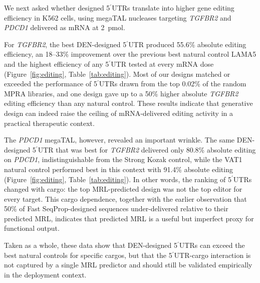 \documentclass[11pt]{article}
\begin{document}
We next asked whether designed 5$^\prime$UTRs translate into higher
gene editing efficiency in K562 cells, using megaTAL nucleases
targeting \emph{TGFBR2} and \emph{PDCD1} delivered as mRNA at 2~pmol.

For \emph{TGFBR2}, the best DEN-designed 5$^\prime$UTR produced
55.6\% absolute editing efficiency, an 18--33\% improvement over the
previous best natural control LAMA5 and the highest efficiency of any
5$^\prime$UTR tested at every mRNA dose (Figure~\ref{fig:editing},
Table~\ref{tab:editing}). Most of our designs matched or exceeded the
performance of 5$^\prime$UTRs drawn from the top 0.02\% of the random
MPRA libraries, and one design gave up to a 50\% higher absolute
\emph{TGFBR2} editing efficiency than any natural control. These
results indicate that generative design can indeed raise the ceiling
of mRNA-delivered editing activity in a practical therapeutic context.

The \emph{PDCD1} megaTAL, however, revealed an important wrinkle. The
same DEN-designed 5$^\prime$UTR that was best for \emph{TGFBR2}
delivered only 80.8\% absolute editing on \emph{PDCD1}, indistinguishable
from the Strong Kozak control, while the VAT1 natural control performed
best in this context with 91.4\% absolute editing
(Figure~\ref{fig:editing}, Table~\ref{tab:editing}). In other words,
the ranking of 5$^\prime$UTRs changed with cargo: the top MRL-predicted
design was not the top editor for every target. This cargo dependence,
together with the earlier observation that 50\% of
Fast SeqProp-designed sequences under-delivered relative to their
predicted MRL, indicates that predicted MRL is a useful but imperfect
proxy for functional output.

Taken as a whole, these data show that DEN-designed
5$^\prime$UTRs can exceed the best natural controls for specific
cargos, but that the 5$^\prime$UTR-cargo interaction is not captured
by a single MRL predictor and should still be validated empirically
in the deployment context.
\end{document}
